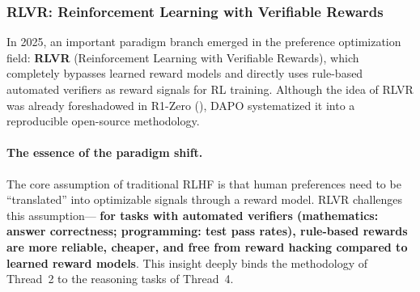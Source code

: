 \subsubsection{RLVR: Reinforcement Learning with Verifiable Rewards}
\label{sec:t2-rlvr}

In 2025, an important paradigm branch emerged in the preference optimization field:
\textbf{RLVR} (Reinforcement Learning with Verifiable Rewards),
which completely bypasses learned reward models
and directly uses rule-based automated verifiers as reward signals for RL training.
Although the idea of RLVR was already foreshadowed in R1-Zero \cite{deepseek2025r1}
(),
DAPO \cite{yu2025dapo} systematized it into a reproducible open-source methodology.

\paragraph{The essence of the paradigm shift.}
The core assumption of traditional RLHF is that
human preferences need to be ``translated'' into optimizable signals through a reward model.
RLVR challenges this assumption---
\textbf{for tasks with automated verifiers (mathematics: answer correctness; programming: test pass rates),
rule-based rewards are more reliable, cheaper, and free from reward hacking compared to learned reward models}.
This insight deeply binds the methodology of Thread~2 to the reasoning tasks of Thread~4.

